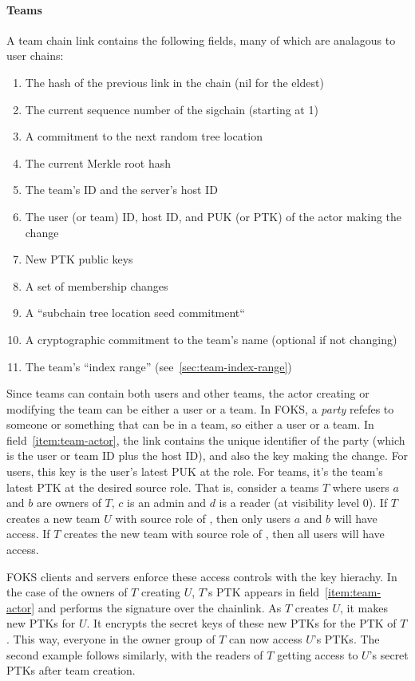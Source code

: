 \paragraph{Teams} A team chain link contains the following fields, many of which
are analagous to user chains:

\begin{enumerate}[label=T.\arabic*]\itemsep0em
    \item The hash of the previous link in the chain (nil for the eldest)
    \item The current sequence number of the sigchain (starting at 1)
    \item A commitment to the next random tree location
      \label{item:next-tree-location}
    \item The current Merkle root hash 
    \item The team's ID and the server's host ID
    \item The user (or team) ID, host ID, and PUK (or PTK) of the actor making the change
       \label{item:team-actor}
    \item New PTK public keys
    \item \label{item:membership} A set of membership changes
    \item A ``subchain tree location seed commitment``
    \item A cryptographic commitment to the team's name (optional if not changing)
    \item The team's ``index range'' (see~\ref{sec:team-index-range})
\end{enumerate}

Since teams can contain both users and other teams, the actor creating or
modifying the team can be either a user or a team. In FOKS, a \textit{party}
refefes to someone or something that can be in a team, so either a user or a
team. In field~\ref{item:team-actor}, the link contains the unique identifier of
the party (which is the user or team ID plus the host ID), and also the key
making the change. For users, this key is the user's latest PUK at the \owner{}
role.  For teams, it's the team's latest PTK at the desired source role. That
is, consider a teams $T$  where users $a$ and $b$ are owners of $T$, $c$ is an
admin and $d$ is a reader (at visibility level 0). If $T$ creates a new team $U$
with source role of \owner, then only users $a$ and $b$ will have access. If
$T$ creates the new team with source role of \reader, then all users will have
access. 

FOKS clients and servers enforce these access controls with the key hierachy.
In the case of the owners of $T$ creating $U$, $T$'s \owner{} PTK appears in
field~\ref{item:team-actor} and performs the signature over the chainlink. 
As $T$ creates $U$, it makes new PTKs for $U$. It encrypts the secret keys
of these new PTKs for the \owner{} PTK of $T$. This way, everyone in the owner
group of $T$ can now access $U$'s PTKs. The second example follows similarly,
with the readers of $T$ getting access to $U$'s secret PTKs after team creation.

